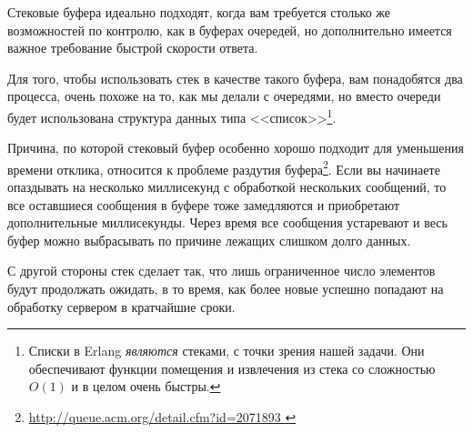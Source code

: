 \documentclass[11pt, oneside]{book}   	%
\begin{document}
Стековые буфера идеально подходят, когда вам требуется столько же возможностей по контролю, как в буферах очередей, но дополнительно имеется важное требование быстрой скорости ответа.

Для того, чтобы использовать стек в качестве такого буфера, вам понадобятся два процесса, очень похоже на то, как мы делали с очередями, но вместо очереди будет использована структура данных типа <<список>>\footnote{Списки в Erlang \emph{являются} стеками, с точки зрения нашей задачи. Они обеспечивают функции помещения и извлечения из стека со сложностью $O(1)$ и в целом очень быстры.}.

Причина, по которой стековый буфер особенно хорошо подходит для уменьшения времени отклика, относится к проблеме раздутия буфера\footnote{\href{http://queue.acm.org/detail.cfm?id=2071893}{http://queue.acm.org/detail.cfm?id=2071893 }}. Если вы начинаете опаздывать на несколько миллисекунд с обработкой нескольких сообщений, то все оставшиеся сообщения в буфере тоже замедляются и приобретают дополнительные миллисекунды. Через время все сообщения устаревают и весь буфер можно выбрасывать по причине лежащих слишком долго данных.


С другой стороны стек сделает так, что лишь ограниченное число элементов будут продолжать ожидать, в то время, как более новые успешно попадают на обработку сервером в кратчайшие сроки.
\end{document}
